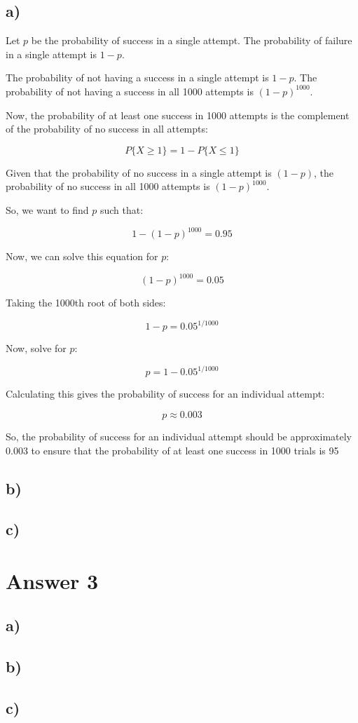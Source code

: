 \documentclass[12pt]{article}
\begin{document}
\subsection*{a)} 

Let $p$ be the probability of success in a single attempt. The probability of failure in a single attempt is $1 - p$.

The probability of not having a success in a single attempt is $1 - p$. The probability of not having a success in all 1000 attempts is $(1 - p)^{1000}$.

Now, the probability of at least one success in 1000 attempts is the complement of the probability of no success in all attempts:

\[
P\{X \geq 1\} = 1 - P\{X \leq 1\}
\]

Given that the probability of no success in a single attempt is $(1 - p)$, the probability of no success in all 1000 attempts is $(1 - p)^{1000}$.

So, we want to find $p$ such that:

\[
1 - (1 - p)^{1000} = 0.95
\]

Now, we can solve this equation for $p$:

\[
(1 - p)^{1000} = 0.05
\]

Taking the 1000th root of both sides:

\[
1 - p = 0.05^{1/1000}
\]

Now, solve for $p$:

\[
p = 1 - 0.05^{1/1000}
\]

Calculating this gives the probability of success for an individual attempt:

\[
p \approx 0.003
\]

So, the probability of success for an individual attempt should be approximately $0.003$ to ensure that the probability of at least one success in 1000 trials is 95%


\subsection*{b)} 

\subsection*{c)} 


\section*{Answer 3}
\subsection*{a)} 
\subsection*{b)} 
\subsection*{c)} 
\end{document}
